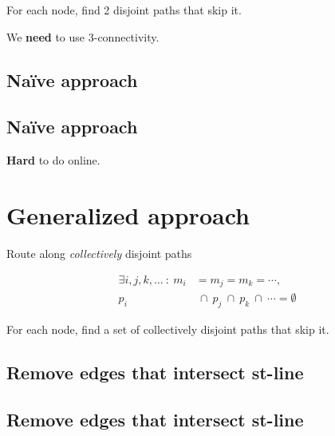 \documentclass[11pt]{article}
\begin{document}
For each node, find 2 disjoint paths that skip it.

\begin{NOTES}
We \textbf{need} to use 3-connectivity.
\end{NOTES}
\subsection*{Naïve approach}
\label{sec:orgf61f905}
\begin{center}

\end{center}
\subsection*{Naïve approach}
\label{sec:org2c0449e}
\begin{center}

\end{center}

\begin{NOTES}
\textbf{Hard} to do online.
\end{NOTES}
\section*{Generalized approach}
\label{sec:orga56dbe7}

Route along \emph{collectively} disjoint paths

\begin{align*}
\exists i,j,k,... \ : \ m_i &= m_j = m_k = \cdots, \\
                  p_i &\ \cap \ p_j \ \cap \ p_k \ \cap \ \cdots = \emptyset
\end{align*}

For each node, find a set of collectively disjoint paths that skip it.
\subsection*{Remove edges that intersect st-line}
\label{sec:orgba4b63f}
\begin{center}

\end{center}
\subsection*{Remove edges that intersect st-line}
\label{sec:org08ddae8}
\begin{center}

\end{center}
\end{document}
